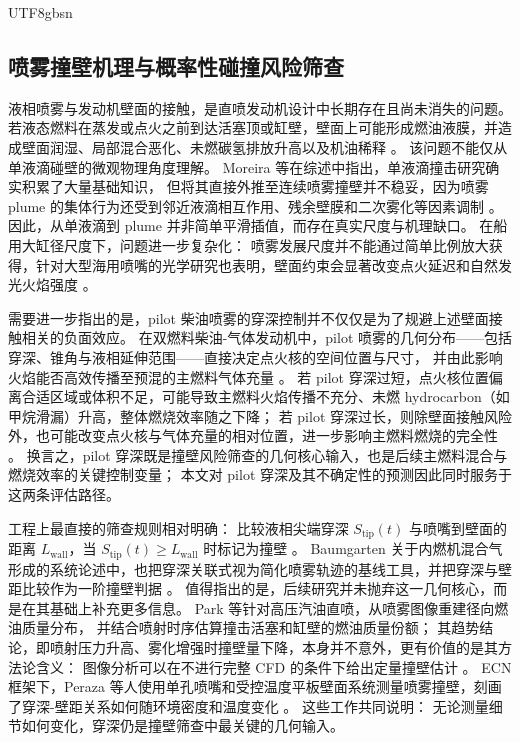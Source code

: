 \documentclass[english, 12pt, a4paper, elec, utf8, a-2b, online]{aaltothesis}
\begin{document}
\begin{CJK*}{UTF8}{gbsn}
\subsection{喷雾撞壁机理与概率性碰撞风险筛查}

液相喷雾与发动机壁面的接触，是直喷发动机设计中长期存在且尚未消失的问题。
若液态燃料在蒸发或点火之前到达活塞顶或缸壁，壁面上可能形成燃油液膜，并造成壁面润湿、局部混合恶化、未燃碳氢排放升高以及机油稀释
\cite{peraza2022swi,ahmad2025fueldilution,MorieiraMotaPanao2010}。
该问题不能仅从单液滴碰壁的微观物理角度理解。
Moreira 等在综述中指出，单液滴撞击研究确实积累了大量基础知识，
但将其直接外推至连续喷雾撞壁并不稳妥，因为喷雾 plume 的集体行为还受到邻近液滴相互作用、残余壁膜和二次雾化等因素调制
\cite{MorieiraMotaPanao2010}。
因此，从单液滴到 plume 并非简单平滑插值，而存在真实尺度与机理缺口。
在船用大缸径尺度下，问题进一步复杂化：
喷雾发展尺度并不能通过简单比例放大获得，针对大型海用喷嘴的光学研究也表明，壁面约束会显著改变点火延迟和自然发光火焰强度
\cite{liu2024marine_impingement}。

需要进一步指出的是，pilot 柴油喷雾的穿深控制并不仅仅是为了规避上述壁面接触相关的负面效应。
在双燃料柴油-气体发动机中，pilot 喷雾的几何分布——包括穿深、锥角与液相延伸范围——直接决定点火核的空间位置与尺寸，
并由此影响火焰能否高效传播至预混的主燃料气体充量
\cite{Karim2015DualFuel,WeiGeng2016DualFuelReview,Sahoo2009DualFuelReview}。
若 pilot 穿深过短，点火核位置偏离合适区域或体积不足，可能导致主燃料火焰传播不充分、未燃 hydrocarbon（如甲烷滑漏）升高，整体燃烧效率随之下降；
若 pilot 穿深过长，则除壁面接触风险外，也可能改变点火核与气体充量的相对位置，进一步影响主燃料燃烧的完全性
\cite{WeiGeng2016DualFuelReview,Sahoo2009DualFuelReview}。
换言之，pilot 穿深既是撞壁风险筛查的几何核心输入，也是后续主燃料混合与燃烧效率的关键控制变量；
本文对 pilot 穿深及其不确定性的预测因此同时服务于这两条评估路径。

工程上最直接的筛查规则相对明确：
比较液相尖端穿深 $S_\mathrm{tip}(t)$ 与喷嘴到壁面的距离 $L_\mathrm{wall}$，当 \(S_\mathrm{tip}(t) \geq L_\mathrm{wall}\) 时标记为撞壁
\cite{Baumgarten2006MixFormation}。
Baumgarten 关于内燃机混合气形成的系统论述中，也把穿深关联式视为简化喷雾轨迹的基线工具，并把穿深与壁距比较作为一阶撞壁判据
\cite{Baumgarten2006MixFormation}。
值得指出的是，后续研究并未抛弃这一几何核心，而是在其基础上补充更多信息。
Park 等针对高压汽油直喷，从喷雾图像重建径向燃油质量分布，
并结合喷射时序估算撞击活塞和缸壁的燃油质量份额；
其趋势结论，即喷射压力升高、雾化增强时撞壁量下降，本身并不意外，更有价值的是其方法论含义：
图像分析可以在不进行完整 CFD 的条件下给出定量撞壁估计
\cite{Park2018WallImpingement}。
ECN 框架下，Peraza 等人使用单孔喷嘴和受控温度平板壁面系统测量喷雾撞壁，刻画了穿深-壁距关系如何随环境密度和温度变化
\cite{peraza2022swi}。
这些工作共同说明：
无论测量细节如何变化，穿深仍是撞壁筛查中最关键的几何输入。


\end{CJK*}
\end{document}
